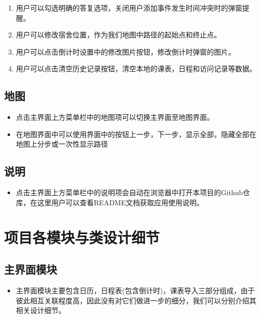 \documentclass[11pt,hyperref,a4paper,UTF8]{ctexart}
\begin{document}
\begin{CJK}{UTF8}{gkai}
\begin{enumerate}
    \item 用户可以勾选明确的答复选项，关闭用户添加事件发生时间冲突时的弹窗提醒。
    \item 用户可以修改宿舍位置，作为我们地图中路径的起始点和终止点。
    \item 用户可以点击倒计时设置中的修改图片按钮，修改倒计时弹窗的图片。
    \item 用户可以点击清空历史记录按钮，清空本地的课表，日程和访问记录等数据。
\end{enumerate}

\subsection{地图}
\begin{itemize}
    \item 点击主界面上方菜单栏中的地图项可以切换主界面至地图界面。
    \item 在地图界面中可以使用界面中的按钮上一步，下一步，显示全部，隐藏全部在地图上分步或一次性显示路径
\end{itemize}

\subsection{说明}
\begin{itemize}
    \item 点击主界面上方菜单栏中的说明项会自动在浏览器中打开本项目的Github仓库，在这里用户可以查看README文档获取应用使用说明。
\end{itemize}

\section{项目各模块与类设计细节}

\subsection{主界面模块}
\begin{itemize}
    \item 主界面模块主要包含日历，日程表(包含倒计时)，课表导入三部分组成，由于彼此相互关联程度高，因此没有对它们做进一步的细分，我们可以分别介绍其相关设计细节。 
\end{itemize}



\end{CJK}
\end{document}

